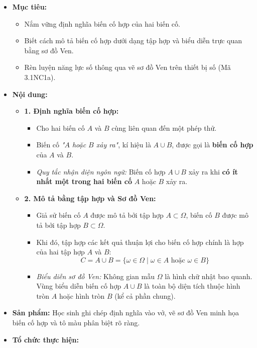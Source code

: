 \documentclass[12pt, a4paper]{article}
\begin{document}
\begin{itemize}[leftmargin=1.2cm]
    \item[a)] \textbf{Mục tiêu:}
    \begin{itemize}[leftmargin=0.6cm]
        \item Nắm vững định nghĩa biến cố hợp của hai biến cố.
        \item Biết cách mô tả biến cố hợp dưới dạng tập hợp và biểu diễn trực quan bằng sơ đồ Ven.
        \item Rèn luyện năng lực số thông qua vẽ sơ đồ Ven trên thiết bị số (Mã 3.1NC1a).
    \end{itemize}

    \item[b)] \textbf{Nội dung:}
    \begin{itemize}[leftmargin=0.6cm]
        \item \textbf{1. Định nghĩa biến cố hợp:}
        \begin{itemize}
            \item Cho hai biến cố $A$ và $B$ cùng liên quan đến một phép thử.
            \item Biến cố \textit{"$A$ hoặc $B$ xảy ra"}, kí hiệu là $A \cup B$, được gọi là \textbf{biến cố hợp} của $A$ và $B$.
            \item \textit{Quy tắc nhận diện ngôn ngữ:} Biến cố hợp $A \cup B$ xảy ra khi \textbf{có ít nhất một trong hai biến cố} $A$ hoặc $B$ xảy ra.
        \end{itemize}

        \item \textbf{2. Mô tả bằng tập hợp và Sơ đồ Ven:}
        \begin{itemize}
            \item Giả sử biến cố $A$ được mô tả bởi tập hợp $A \subset \Omega$, biến cố $B$ được mô tả bởi tập hợp $B \subset \Omega$.
            \item Khi đó, tập hợp các kết quả thuận lợi cho biến cố hợp chính là hợp của hai tập hợp $A$ và $B$:
            $$C = A \cup B = \{\omega \in \Omega \mid \omega \in A \text{ hoặc } \omega \in B\}$$
            \item \textit{Biểu diễn sơ đồ Ven:} Không gian mẫu $\Omega$ là hình chữ nhật bao quanh. Vùng biểu diễn biến cố hợp $A \cup B$ là toàn bộ diện tích thuộc hình tròn $A$ hoặc hình tròn $B$ (kể cả phần chung).
        \end{itemize}
    \end{itemize}

    \item[c)] \textbf{Sản phẩm:} Học sinh ghi chép định nghĩa vào vở, vẽ sơ đồ Ven minh họa biến cố hợp và tô màu phân biệt rõ ràng.
    \item[d)] \textbf{Tổ chức thực hiện:}
\end{itemize}
\end{document}
